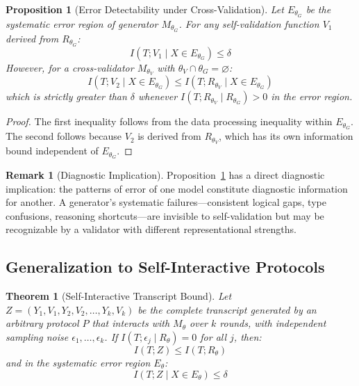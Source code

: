 \documentclass[11pt,a4paper]{article}
\newtheorem{proposition}{Proposition}[section]
\newtheorem{theorem}{Theorem}[section]
\theoremstyle{definition}
\newtheorem{remark}{Remark}[section]
\newcommand{\Rtheta}{R_\theta}
\newcommand{\thetaG}{\theta_G}
\newcommand{\thetaV}{\theta_V}
\begin{document}
\begin{proposition}[Error Detectability under Cross-Validation]
\label{prop:crossval}
Let $E_{\thetaG}$ be the systematic error region of generator $M_{\thetaG}$. For any self-validation function $V_1$ derived from $R_{\thetaG}$:
\begin{equation}
I(T; V_1 \mid X \in E_{\thetaG}) \leq \delta
\end{equation}
However, for a cross-validator $M_{\thetaV}$ with $\thetaV \cap \thetaG = \varnothing$:
\begin{equation}
I(T; V_2 \mid X \in E_{\thetaG}) \leq I(T; R_{\thetaV} \mid X \in E_{\thetaG})
\end{equation}
which is strictly greater than $\delta$ whenever $I(T; R_{\thetaV} \mid R_{\thetaG}) > 0$ in the error region.
\end{proposition}

\begin{proof}
The first inequality follows from the data processing inequality within $E_{\thetaG}$. The second follows because $V_2$ is derived from $R_{\thetaV}$, which has its own information bound independent of $E_{\thetaG}$.
\end{proof}

\begin{remark}[Diagnostic Implication]
\label{rem:diagnostic}
Proposition~\ref{prop:crossval} has a direct diagnostic implication: the patterns of error of one model constitute diagnostic information for another. A generator's systematic failures---consistent logical gaps, type confusions, reasoning shortcuts---are invisible to self-validation but may be recognizable by a validator with different representational strengths.
\end{remark}


\subsection{Generalization to Self-Interactive Protocols}

\begin{theorem}[Self-Interactive Transcript Bound]
\label{thm:transcript}
Let $Z = (Y_1, V_1, Y_2, V_2, \ldots, Y_k, V_k)$ be the complete transcript generated by an arbitrary protocol $P$ that interacts with $M_\theta$ over $k$ rounds, with independent sampling noise $\epsilon_1, \ldots, \epsilon_k$. If $I(T; \epsilon_j \mid \Rtheta) = 0$ for all $j$, then:
\begin{equation}
I(T; Z) \leq I(T; \Rtheta)
\end{equation}
and in the systematic error region $E_\theta$:
\begin{equation}
I(T; Z \mid X \in E_\theta) \leq \delta
\end{equation}
\end{theorem}
\end{document}
